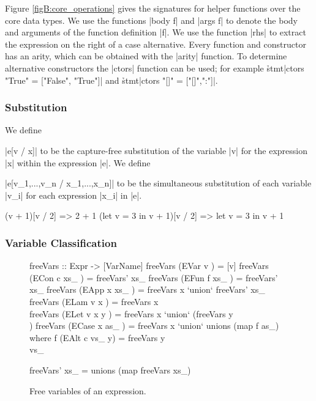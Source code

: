 Figure \ref{figB:core_operations} gives the signatures for helper functions over the core data types. We use the functions |body f| and |args f| to denote the body and arguments of the function definition |f|. We use the function |rhs| to extract the expression on the right of a case alternative. Every function and constructor has an arity, which can be obtained with the |arity| function. To determine alternative constructors the |ctors| function can be used; for example \h{stmt}|ctors "True" = ["False", "True"]| and \h{stmt}|ctors "[]" = ["[]",":"]|.


\subsubsection{Substitution}

We define \ignore|e[v / x]| to be the capture-free substitution of the variable |v| for the expression |x| within the expression |e|. We define \ignore|e[v_1,...,v_n / x_1,...,x_n]| to be the simultaneous substitution of each variable |v_i| for each expression |x_i| in |e|.

\begin{example}
\ignore\begin{code}
(v + 1)[v / 2]               => 2 + 1
(let v = 3 in v + 1)[v / 2]  => let v = 3 in v + 1
\end{code}
\end{example}

\subsubsection{Variable Classification}

\begin{figure}
\begin{code}
freeVars :: Expr -> [VarName]
freeVars (EVar v       ) = [v]
freeVars (ECon c xs_   ) = freeVars' xs_
freeVars (EFun f xs_   ) = freeVars' xs_
freeVars (EApp x xs_   ) = freeVars x `union` freeVars' xs_
freeVars (ELam v x     ) = freeVars x \\ [v]
freeVars (ELet v x y   ) = freeVars x `union` (freeVars y \\ [v])
freeVars (ECase x as_  ) = freeVars x `union` unions (map f as_)
    where f (EAlt c vs_ y) = freeVars y \\ vs_

freeVars' xs_ = unions (map freeVars xs_)
\end{code}
\caption{Free variables of an expression.}
\label{figB:free_variables}
\end{figure}


